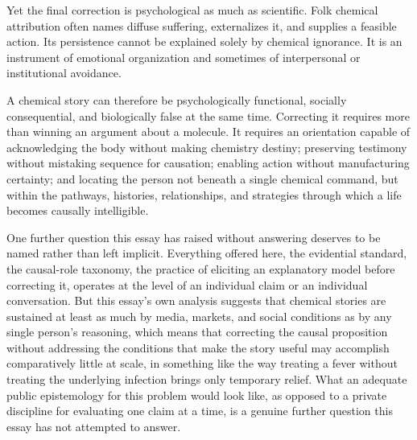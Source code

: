\documentclass[11pt]{article}
\begin{document}
Yet the final correction is psychological as much as scientific. Folk chemical attribution often names diffuse suffering, externalizes it, and supplies a feasible action. Its persistence cannot be explained solely by chemical ignorance. It is an instrument of emotional organization and sometimes of interpersonal or institutional avoidance.

A chemical story can therefore be psychologically functional, socially consequential, and biologically false at the same time. Correcting it requires more than winning an argument about a molecule. It requires an orientation capable of acknowledging the body without making chemistry destiny; preserving testimony without mistaking sequence for causation; enabling action without manufacturing certainty; and locating the person not beneath a single chemical command, but within the pathways, histories, relationships, and strategies through which a life becomes causally intelligible.

One further question this essay has raised without answering deserves to be named rather than left implicit. Everything offered here, the evidential standard, the causal-role taxonomy, the practice of eliciting an explanatory model before correcting it, operates at the level of an individual claim or an individual conversation. But this essay's own analysis suggests that chemical stories are sustained at least as much by media, markets, and social conditions as by any single person's reasoning, which means that correcting the causal proposition without addressing the conditions that make the story useful may accomplish comparatively little at scale, in something like the way treating a fever without treating the underlying infection brings only temporary relief. What an adequate public epistemology for this problem would look like, as opposed to a private discipline for evaluating one claim at a time, is a genuine further question this essay has not attempted to answer.



\end{document}
